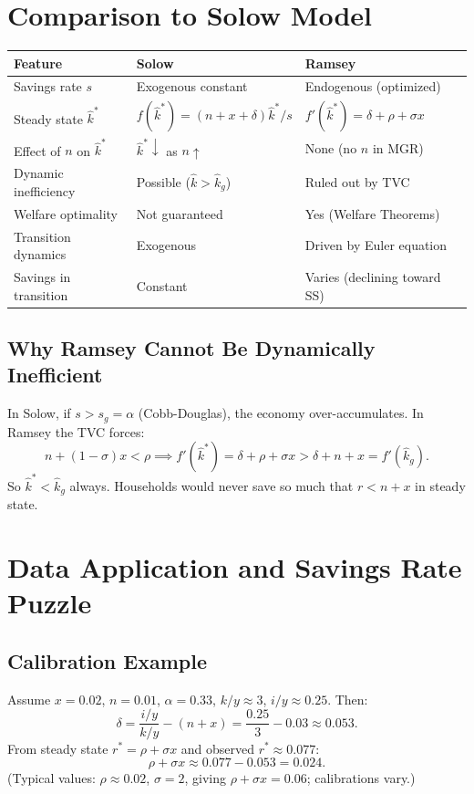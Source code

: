 \documentclass[a4paper,11pt]{article}
\newcommand{\khat}{\hat{k}}
\begin{document}
\section{Comparison to Solow Model}

\begin{center}
\begin{tabular}{lll}
\toprule
\textbf{Feature} & \textbf{Solow} & \textbf{Ramsey} \\
\midrule
Savings rate $s$ & Exogenous constant & Endogenous (optimized) \\
Steady state $\khat^*$ & $f(\khat^*) = (n+x+\delta)\khat^*/s$ & $f'(\khat^*) = \delta + \rho + \sigma x$ \\
Effect of $n$ on $\khat^*$ & $\khat^* \downarrow$ as $n \uparrow$ & None (no $n$ in MGR) \\
Dynamic inefficiency & Possible ($\khat > \khat_g$) & Ruled out by TVC \\
Welfare optimality & Not guaranteed & Yes (Welfare Theorems) \\
Transition dynamics & Exogenous & Driven by Euler equation \\
Savings in transition & Constant & Varies (declining toward SS) \\
\bottomrule
\end{tabular}
\end{center}

\subsection*{Why Ramsey Cannot Be Dynamically Inefficient}
In Solow, if $s > s_g = \alpha$ (Cobb-Douglas), the economy over-accumulates. In Ramsey the TVC forces:
\[
  n + (1-\sigma)x < \rho \implies f'(\khat^*) = \delta + \rho + \sigma x > \delta + n + x = f'(\khat_g).
\]
So $\khat^* < \khat_g$ always. Households would never save so much that $r < n + x$ in steady state.

\section{Data Application and Savings Rate Puzzle}

\subsection*{Calibration Example}
Assume $x = 0.02$, $n = 0.01$, $\alpha = 0.33$, $k/y \approx 3$, $i/y \approx 0.25$. Then:
\[
  \delta = \frac{i/y}{k/y} - (n+x) = \frac{0.25}{3} - 0.03 \approx 0.053.
\]
From steady state $r^* = \rho + \sigma x$ and observed $r^* \approx 0.077$:
\[
  \rho + \sigma x \approx 0.077 - 0.053 = 0.024.
\]
(Typical values: $\rho \approx 0.02$, $\sigma = 2$, giving $\rho + \sigma x = 0.06$; calibrations vary.)
\end{document}
